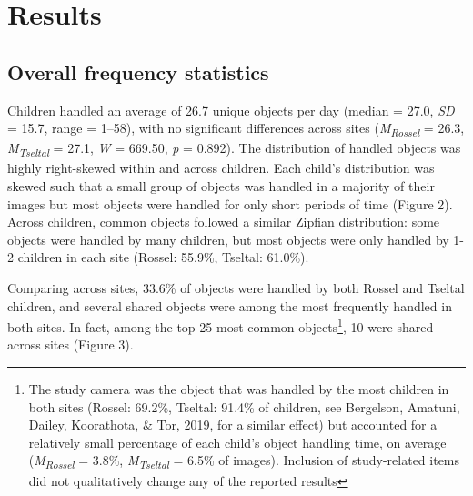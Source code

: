 \documentclass[10pt, letterpaper]{article}
\begin{document}
\hypertarget{results}{%
\section{Results}\label{results}}

\hypertarget{overall-frequency-statistics}{%
\subsection{Overall frequency
statistics}\label{overall-frequency-statistics}}

Children handled an average of 26.7 unique objects per day (median =
27.0, \emph{SD} = 15.7, range = 1--58), with no significant differences
across sites (\emph{M}\textsubscript{\emph{Rossel}} = 26.3,
\emph{M}\textsubscript{\emph{Tseltal}} = 27.1, \emph{W} = 669.50,
\emph{p} = 0.892). The distribution of handled objects was highly
right-skewed within and across children. Each child's distribution was
skewed such that a small group of objects was handled in a majority of
their images but most objects were handled for only short periods of
time (Figure 2). Across children, common objects followed a similar
Zipfian distribution: some objects were handled by many children, but
most objects were only handled by 1-2 children in each site (Rossel:
55.9\%, Tseltal: 61.0\%).

Comparing across sites, 33.6\% of objects were handled by both Rossel
and Tseltal children, and several shared objects were among the most
frequently handled in both sites. In fact, among the top 25 most common
objects\footnote{The study camera was the object that was handled by the
  most children in both sites (Rossel: 69.2\%, Tseltal: 91.4\% of
  children, see Bergelson, Amatuni, Dailey, Koorathota, \& Tor, 2019,
  for a similar effect) but accounted for a relatively small percentage
  of each child's object handling time, on average
  (\emph{M}\textsubscript{\emph{Rossel}} = 3.8\%,
  \emph{M}\textsubscript{\emph{Tseltal}} = 6.5\% of images). Inclusion
  of study-related items did not qualitatively change any of the
  reported results}, 10 were shared across sites (Figure 3).
\end{document}
